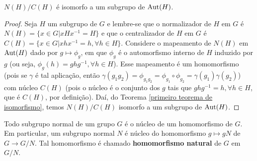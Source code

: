 	\begin{theorem}
		\label{normalizador centralizador}
		$N(H)/C(H)$ é isomorfo a um subgrupo de $\operatorname{Aut}(H)$. 
	\end{theorem}
	
	\begin{proof}
		Seja $H$ um subgrupo de $G$ e lembre-se que o normalizador de $H$ em $G$ é $N(H) = \{ x\in G| xHx^{-1} = H \}$ e que o centralizador de $H$ em $G$ é $C(H) = \{ x\in G| xhx^{-1} = h, \forall h\in H \}$. Considere o mapeamento de $N(H)$ em $\operatorname{Aut}(H)$ dado por $g\mapsto \phi_g$, em que $\phi_g$ é o automorfismo interno de $H$ induzido por $g$ (ou seja, $\phi_g(h) = ghg^{-1}, \forall h\in H$). Esse mapeamento é um homomorfismo (pois se $\gamma$ é tal aplicação, então $\gamma(g_1g_2) = \phi_{g_1g_2} = \phi_{g_1}\circ\phi_{g_2} = \gamma(g_1)\gamma(g_2)$) com núcleo $C(H)$ (pois o núcleo é o conjunto dos $g$ tais que $ghg^{-1} = h, \forall h\in H$, que é $C(H)$, por definição). Daí, do Teorema \eqref{primeiro teorema de isomorfismo}, temos $N(H)/C(H)$ isomorfo a um subgrupo de $\operatorname{Aut}(H)$.
	\end{proof}
	
	\begin{theorem}
		\label{subgrupos normais e nucleos}
		Todo subgrupo normal de um grupo $G$ é o núcleo de um homomorfismo de $G$. Em particular, um subgrupo normal $N$ é núcleo do homomorfismo $g\mapsto gN$ de $G\to G/N$. Tal homomorfismo é chamado \textbf{homomorfismo natural} de $G$ em $G/N$.
	\end{theorem}
	
